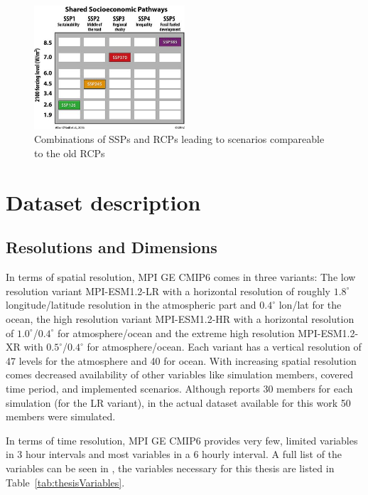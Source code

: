 \begin{figure}[bht]
  \begin{center}
    \includegraphics[width=0.5\textwidth]{figures/ssp_rcp_matrix.jpeg}
  \end{center}
  \caption{Combinations of SSPs and RCPs leading to scenarios compareable to the old RCPs \cite{bottinger_michael_ssp_nodate}}
  \label{fig:ssprcp}
\end{figure}


\section{Dataset description}




\subsection{Resolutions and Dimensions}
\label{sec:dataset-description}

In terms of spatial resolution, MPI GE CMIP6 comes in three variants: The low resolution variant MPI-ESM1.2-LR with a horizontal resolution of roughly $1.8^\circ$ longitude/latitude resolution in the atmospheric part and $0.4^\circ$ lon/lat for the ocean, the high resolution variant MPI-ESM1.2-HR with a horizontal resolution of $1.0^\circ$/$0.4^\circ$ for atmosphere/ocean and the extreme high resolution MPI-ESM1.2-XR with $0.5^\circ$/$0.4^\circ$ for atmosphere/ocean. 
Each variant has a vertical resolution of 47 levels for the atmosphere and 40 for ocean.
With increasing spatial resolution comes decreased availability of other variables like simulation members, covered time period, and implemented scenarios. 
Although \cite{olonscheck_new_2023} reports 30 members for each simulation (for the LR variant), in the actual dataset available for this work 50 members were simulated. 

In terms of time resolution, MPI GE CMIP6 provides very few, limited variables in 3 hour intervals and most variables in a 6 hourly interval.  
A full list of the variables can be seen in \cite[Table 3]{olonscheck_new_2023}, the variables necessary for this thesis are listed in Table~\ref{tab:thesisVariables}. 

